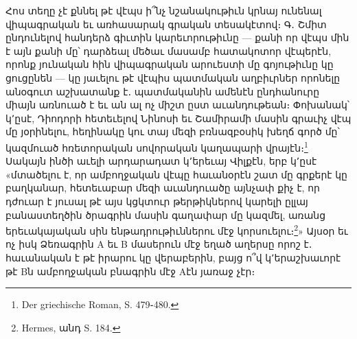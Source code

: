 \documentclass{article}
\begin{document}
{Հոս տեղը չէ քննել թէ վէպս ի՞նչ նշանակութիւն կրնայ ունենալ վիպագրական եւ առհասարակ գրական տեսակէտով։ Գ․ Շմիտ ընդունելով հանդերձ գիւտին կարեւորութիւնը — քանի որ վէպս մին է այն քանի մը՝ դարձեալ մեծաւ մասամբ հատակոտոր վէպերէն, որոնք յունական հին վիպագրական արուեստի մը գոյութիւնը կը ցուցընեն — կը յաւելու թէ վէպիս պատմական աղբիւրներ որոնելը անօգուտ աշխատանք է․ պատմականին ամենէն ընդհանուրը միայն առնուած է եւ ան ալ ոչ միշտ ըստ աւանդութեան։ Փոխանակ՝ կ՚ըսէ, Դիոդորի հետեւելով Նինոսի եւ Շամիրամի մասին գրաւիչ վէպ մը յօրինելու, հեղինակը կու տայ մեզի բռնազբօսիկ խեղճ գործ մը՝ կազմուած հռետորական սովորական կաղապարի վրայէն։\footnote{Der griechische Roman, S. 479֊480.} Սակայն ինծի աւելի արդարադատ կ՚երեւայ Վիլքէն, երբ կ՚ըսէ «մտածելու է, որ ամբողջական վէպը հաւանօրէն շատ մը գրքերէ կը բաղկանար, հետեւաբար մեզի աւանդուածը այնչափ քիչ է, որ դժուար է յուսալ թէ այս կցկտուր թերթիկներով կարելի ըլլայ բանաստեղծին ծրագրին մասին գաղափար մը կազմել, առանց երեւակայական սին ենթադրութիւններու մէջ կորսուելու։\footnote{Hermes, անդ S. 184.}» Այսօր եւ ոչ իսկ Ձեռագրին Α եւ Β մասերուն մէջ եղած աղերսը որոշ է․ հաւանական է թէ իրարու կը վերաբերին, բայց ո՞վ կ՚երաշխաւորէ թէ Βն ամբողջական բնագրին մէջ Αէն յառաջ չէր։

}
\end{document}
